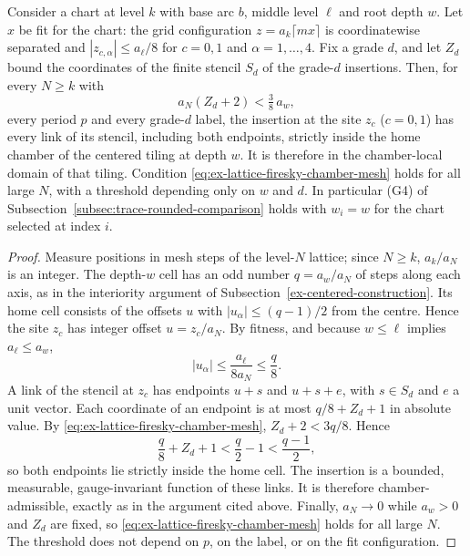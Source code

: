 \begin{lemma}
\label{lem:ex-lattice-firesky-chamber}
Consider a chart at level $k$ with base arc $b$, middle level $\ell$ and
root depth $w$. Let $x$ be fit for the chart: the grid configuration
$z=a_k\lceil mx\rceil$ is coordinatewise separated and
$|z_{c,\alpha}|\le a_\ell/8$ for $c=0,1$ and $\alpha=1,\dots,4$. Fix a grade
$d$, and let $Z_d$ bound the coordinates of the finite stencil $S_d$ of
the grade-$d$ insertions. Then, for every $N\ge k$ with
\begin{equation}\label{eq:ex-lattice-firesky-chamber-mesh}
 a_N(Z_d+2)<\tfrac38\,a_w ,
\end{equation}
every period $p$ and every grade-$d$ label, the insertion at the site
$z_c$ ($c=0,1$) has every link of its stencil, including both endpoints,
strictly inside the home chamber of the centered tiling at depth $w$. It
is therefore in the chamber-local domain of that tiling. Condition
\eqref{eq:ex-lattice-firesky-chamber-mesh} holds for all large $N$, with
a threshold depending only on $w$ and $d$. In particular (G4) of
Subsection~\ref{subsec:trace-rounded-comparison} holds with $w_i=w$ for
the chart selected at index $i$.
\end{lemma}
\begin{proof}
Measure positions in mesh steps of the level-$N$ lattice; since $N\ge k$,
$a_k/a_N$ is an integer. The depth-$w$
cell has an odd number $q=a_w/a_N$ of steps along each axis, as in the
interiority argument of Subsection~\ref{ex-centered-construction}. Its home
cell consists of the offsets $u$ with $|u_\alpha|\le(q-1)/2$ from the
centre. Hence the site $z_c$ has integer
offset $u=z_c/a_N$. By fitness, and because $w\le\ell$ implies
$a_\ell\le a_w$,
\[
 |u_\alpha|\le\frac{a_\ell}{8a_N}\le\frac{q}{8}.
\]
A link of the stencil at $z_c$ has endpoints $u+s$ and $u+s+e$, with
$s\in S_d$ and $e$ a unit vector. Each coordinate of an endpoint is at
most $q/8+Z_d+1$ in absolute value. By
\eqref{eq:ex-lattice-firesky-chamber-mesh},
$Z_d+2<3q/8$. Hence
\[
 \frac q8+Z_d+1<\frac q2-1<\frac{q-1}2 ,
\]
so both endpoints lie strictly inside the home cell. The insertion is a
bounded, measurable, gauge-invariant function of these links. It is
therefore chamber-admissible, exactly as in the argument cited above.
Finally, $a_N\to0$ while $a_w>0$ and $Z_d$ are fixed, so
\eqref{eq:ex-lattice-firesky-chamber-mesh} holds for all large $N$. The
threshold does not depend on $p$, on the label, or on the fit
configuration.
\end{proof}

